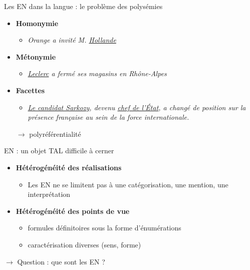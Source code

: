 \documentclass[xetex,xcolor={table,usenames,dvipsnames}]{beamer}
\begin{document}
\begin{frame}{Les \textsc{EN} dans la langue : le problème des polysémies}
	\begin{itemize}
		\item \textcolor{deepblue}{\textbf{Homonymie}}
		\begin{itemize}
			\item \textit{Orange a invité M. \underline{Hollande}}
		\end{itemize}
		\item \textcolor{deepblue}{\textbf{Métonymie}}
		\begin{itemize}
			\item \textit{\underline{Leclerc} a fermé ses magasins en Rhône-Alpes}
		\end{itemize}
		\item \textcolor{deepblue}{\textbf{\og{}Facettes\fg{}}}
		\begin{itemize}
			\item \textit{\underline{Le candidat Sarkozy}, devenu \underline{chef de l'État}, a changé de position sur la présence française au sein de la force internationale.}
		\end{itemize}
		
		$\rightarrow$ \textcolor{deepred}{polyréférentialité}
	\end{itemize}
\end{frame}

\begin{frame}{\textsc{EN} : un objet \textsc{TAL} difficile à cerner}
	\begin{itemize}
	\item 	\textcolor{deepblue}{\textbf{Hétérogénéité des réalisations}}
	\begin{itemize}
		\item Les \textsc{EN} ne se limitent pas à une catégorisation, une mention, une interprétation
	\end{itemize}
		\item \textcolor{deepblue}{\textbf{Hétérogénéité des points de vue}}
		\begin{itemize}
			\item formules définitoires sous la forme d'énumérations
			\item caractérisation diverses (sens, forme)
		\end{itemize}
		\end{itemize}
		
		$\rightarrow$ \textcolor{deepred}{Question : que sont les \textsc{EN} ?}
\end{frame}
\end{document}
